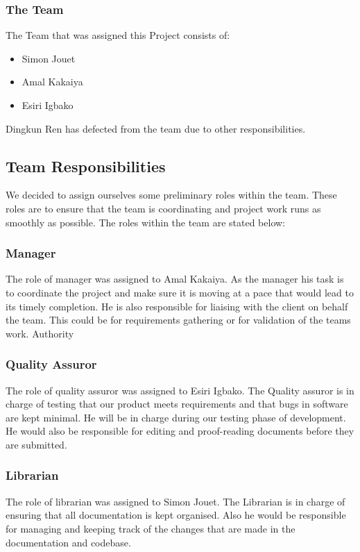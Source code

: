 \documentclass{article}
\begin{document}
\subsubsection{The Team}

The Team that was assigned this Project consists of:
\begin{itemize}
\item Simon Jouet
\item Amal Kakaiya
\item Esiri Igbako
\end{itemize}
Dingkun Ren has defected from the team due to other responsibilities.


\subsection {Team Responsibilities}

We decided to assign ourselves some preliminary roles within the team. These roles are to ensure that the team is coordinating and project work runs as smoothly as possible. The roles within the team are stated below:

\subsubsection {Manager}
The role of manager was assigned to Amal Kakaiya. As the manager his task is to coordinate the project and make sure it is moving at a pace that would lead to its timely completion. He is also responsible for liaising with the client on behalf the team. This could be for requirements gathering or for validation of the teams work.
Authority

\subsubsection {Quality Assuror}
The role of quality assuror was assigned to Esiri Igbako. The Quality assuror is in charge of testing that our product meets requirements and that bugs in software are kept minimal. He will be in charge during our testing phase of development. He would also be responsible for editing and proof-reading documents before they are submitted.

\subsubsection {Librarian}
The role of librarian was assigned to Simon Jouet. The Librarian is in charge of ensuring that all documentation is kept organised. Also he would be responsible for managing and keeping track of the changes that are made in the documentation and codebase.
\end{document}
